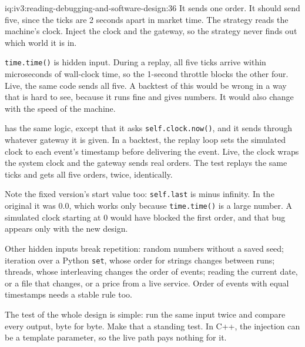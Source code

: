 \begin{solution}{iq:iv3:reading-debugging-and-software-design:36}
It sends one order. It should send five, since the ticks are 2 seconds apart in market time. The strategy reads the machine's clock. Inject the clock and the gateway, so the strategy never finds out which world it is in.

\texttt{time.time()} is hidden input. During a replay, all five ticks arrive within microseconds of wall-clock time, so the 1-second throttle blocks the other four. Live, the same code sends all five. A backtest of this would be wrong in a way that is hard to see, because it runs fine and gives numbers. It would also change with the speed of the machine.

 has the same logic, except that it asks \texttt{self.clock.now()}, and it sends through whatever gateway it is given. In a backtest, the replay loop sets the simulated clock to each event's timestamp before delivering the event. Live, the clock wraps the system clock and the gateway sends real orders. The test replays the same ticks and gets all five orders, twice, identically.

\label{lst:iv3:rd:strategyfixed}

Note the fixed version's start value too: \texttt{self.last} is minus infinity. In the original it was 0.0, which works only because \texttt{time.time()} is a large number. A simulated clock starting at 0 would have blocked the first order, and that bug appears only with the new design.

Other hidden inputs break repetition: random numbers without a saved seed; iteration over a Python \texttt{set}, whose order for strings changes between runs; threads, whose interleaving changes the order of events; reading the current date, or a file that changes, or a price from a live service. Order of events with equal timestamps needs a stable rule too.

The test of the whole design is simple: run the same input twice and compare every output, byte for byte. Make that a standing test. In C++, the injection can be a template parameter, so the live path pays nothing for it.


\end{solution}

